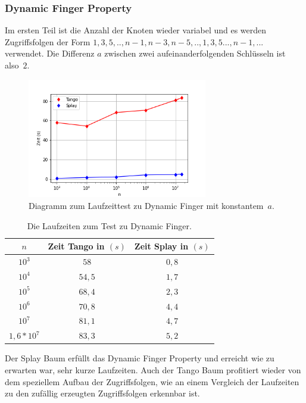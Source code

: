 \documentclass[a4paper,12pt]{article}
\begin{document}
\subsubsection{Dynamic Finger Property}
Im ersten Teil ist die Anzahl der Knoten wieder variabel und es werden Zugriffsfolgen der Form  $1, 3, 5,..,n-1, n-3, n-5, ..,1, 3, 5..., n-1,...$ verwendet. Die Differenz $a$ zwischen zwei aufeinanderfolgenden Schlüsseln ist \mbox{also $2$}.
\begin{figure}[H]
	\centering
	\includegraphics[width=0.7\textwidth]{Medien/laufzeittest/diagramm/dynamicfinger}
	\caption{Diagramm zum Laufzeittest zu Dynamic Finger mit \mbox{konstantem $a$.}}
\end{figure}
\begin{table}[H]
	\begin{center}
		\begin{tabular}[c]{|c|c|c|}
			\hline
			$n$ & Zeit Tango in $\left(s\right)$ &Zeit Splay in $\left(s\right)$ \\
			\hline
			$10^3$ & $58$ &$0,8$ \\
			\hline
			$10^4$  & $54,5$ &$1,7$  \\
			\hline
			$10^5$  & $68,4$ &$2,3$  \\
			\hline
			$10^6$  & $70,8$ &$4,4$  \\
			\hline
			$10^7$  & $81,1$ &$4,7$  \\
			\hline
			$1,6 *10^7$  & $83,3$ &$5,2$  \\
			\hline
		\end{tabular}
		\caption{Die Laufzeiten zum  Test zu Dynamic Finger.} 
	\end{center}
\end{table}
\noindent Der Splay Baum erfüllt das Dynamic Finger Property und erreicht wie zu erwarten war, sehr kurze Laufzeiten. Auch der Tango Baum profitiert wieder von dem speziellem Aufbau der Zugriffsfolgen, wie an einem Vergleich der Laufzeiten zu den zufällig erzeugten Zugriffsfolgen erkennbar ist. 
\end{document}
